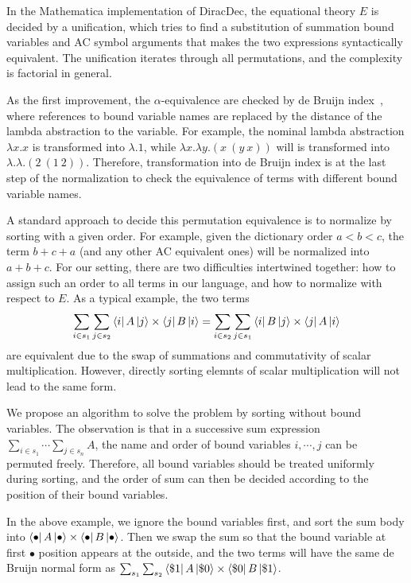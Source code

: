 \documentclass[runningheads]{llncs}
\begin{document}
In the Mathematica implementation of DiracDec, the equational theory $E$ is decided by a unification, which tries to find a substitution of summation bound variables and AC symbol arguments that makes the two expressions syntactically equivalent. The unification iterates through all permutations, and the complexity is factorial in general.

As the first improvement, the $\alpha$-equivalence are checked by de Bruijn index~\cite{deBruijn1972lambda}, where references to bound variable names are replaced by the distance of the lambda abstraction to the variable. For example, the nominal lambda abstraction $\lambda x. x$ is transformed into $\lambda . 1$, while $\lambda x. \lambda y. (x\ (y\ x))$ will is transformed into $\lambda.\lambda. (2\ (1\ 2))$. Therefore, transformation into de Bruijn index is at the last step of the normalization to check the equivalence of terms with different bound variable names.


A standard approach to decide this permutation equivalence is to normalize by sorting with a given order. For example, given the dictionary order $a < b < c$, the term $b + c + a$ (and any other AC equivalent ones) will be normalized into $a + b + c$. For our setting, there are two difficulties intertwined together: how to assign such an order to all terms in our language, and how to normalize with respect to $E$.
As a typical example, the two terms 
\[
    \sum_{i \in s_1} \sum_{j \in s_2} \bra{i}A\ket{j} \times \bra{j}B\ket{i}
    = 
    \sum_{i \in s_2} \sum_{j \in s_1} \bra{i}B\ket{j} \times \bra{j}A\ket{i}
\]
are equivalent due to the swap of summations and commutativity of scalar multiplication. However,
directly sorting elemnts of scalar multiplication will not lead to the same form.

We propose an algorithm to solve the problem by sorting without bound variables. The observation is that in a successive sum expression $\sum_{i \in s_1}\cdots\sum_{j \in s_n}A$, the name and order of bound variables $i, \cdots, j$ can be permuted freely. Therefore, all bound variables should be treated uniformly during sorting, and the order of sum can then be decided according to the position of their bound variables.

In the above example, we ignore the bound variables first, and sort the sum body into $\bra{\bullet}A\ket{\bullet} \times \bra{\bullet}B\ket{\bullet}$. Then we swap the sum so that the bound variable at first $\bullet$ position appears at the outside, and the two terms will have the same de Bruijn normal form as $\sum_{s_1} \sum_{s_2} \bra{\$1} A \ket{\$0} \times \bra{\$0} B \ket{\$1}$.
\end{document}
